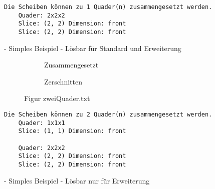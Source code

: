 \documentclass[a4paper,10pt,ngerman]{scrartcl}
\newcommand{\simplecube}[8]%
{
    \begin{scope}[shift={#1}]
        \fill[gray!40,canvas is yz plane at x=#2, opacity=#8] (0,0) rectangle (#3,#4);
        \fill[gray!10,canvas is xz plane at y=#3, opacity=#8] (0,0) rectangle (#2,#4);
        \fill[white  ,canvas is xy plane at z=#4, opacity=#8] (0,0) rectangle (#2,#3);
        \foreach\i/\j in {0/1, 1/1, 1/0}
            {
            \draw[line#5] (0,#3*\i,#4*\j) --++ (#2,0,0);
            \draw[line#6] (#2*\i,0,#4*\j) --++ (0,#3,0);
            \draw[line#7] (#2*\i,#3*\j,0) --++ (0,0,#4);
        }
    \end{scope}
}
\newcommand{\unsolvedSquare}[4]%
{
    \begin{scope}[shift={#1}]
        \simplecube{(0,     0,      0)}     {1}{2}{2}   {a}{a}{a}   {1}
        \simplecube{(1+#4,   0,      0))}    {1}{2}{2}   {a}{a}{a}   {1}
        \simplecube{(2+2*#4,   0,      0))}    {1}{1}{1}   {a}{a}{a}   {1}
    \end{scope}
}
\begin{document}
    \begin{lstlisting}[frame=single, title=Programmausgabe kleinerWuerfel.txt, breaklines=true,label={lst:lstlisting3}]
    Die Scheiben können zu 1 Quader(n) zusammengesetzt werden.
    Quader: 2x2x2
    Slice: (2, 2) Dimension: front
    Slice: (2, 2) Dimension: front
    \end{lstlisting}

    - Simples Beispiel
    - Lösbar für Standard und Erweiterung



    \begin{figure}[H]
        \centering
        \def\a{3.2}
        \def\b{1.2}
        \begin{subfigure}[b]{0.45\textwidth}
            \centering %
            \caption{Zusammengesetzt}\label{fig:figA3}
        \end{subfigure}
        \begin{subfigure}[b]{0.45\textwidth}
            \centering %
            \caption{Zerschnitten}\label{fig:figB3}
        \end{subfigure}
        \caption{Figur zweiQuader.txt}\label{fig:figAB3}
    \end{figure}

    \begin{lstlisting}[frame=single, title=Programmausgabe zweiQuader.txt, breaklines=true,label={lst:lstlisting4}]
    Die Scheiben können zu 2 Quader(n) zusammengesetzt werden.
    Quader: 1x1x1
    Slice: (1, 1) Dimension: front

    Quader: 2x2x2
    Slice: (2, 2) Dimension: front
    Slice: (2, 2) Dimension: front
    \end{lstlisting}

    - Simples Beispiel
    - Lösbar nur für Erweiterung

    \newpage
\end{document}
